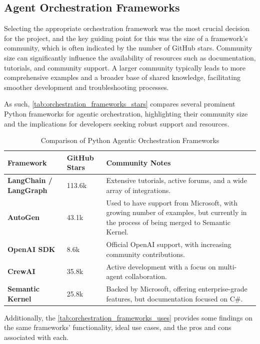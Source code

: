 \documentclass[a4paper]{report}
\begin{document}
\subsection{Agent Orchestration Frameworks}

Selecting the appropriate orchestration framework was the most crucial decision for the project, and the key guiding point for this was the size of a framework's community, which is often indicated by the number of GitHub stars. Community size can significantly influence the availability of resources such as documentation, tutorials, and community support. A larger community typically leads to more comprehensive examples and a broader base of shared knowledge, facilitating smoother development and troubleshooting processes.

As such, \autoref{tab:orchestration_frameworks_stars} compares several prominent Python frameworks for agentic orchestration, highlighting their community size and the implications for developers seeking robust support and resources.

\begin{table}[h]
\centering
\begin{tabular}{|p{3cm}|p{3cm}|p{9cm}|}
    \hline
    \textbf{Framework} & \textbf{GitHub Stars} & \textbf{Community Notes} \\ \hline
    \textbf{LangChain / LangGraph} & 113.6k & Extensive tutorials, active forums, and a wide array of integrations. \\ \hline
    \textbf{AutoGen} & 43.1k & Used to have support from Microsoft, with growing number of examples, but currently in the process of being merged to Semantic Kernel. \\ \hline
    \textbf{OpenAI SDK} & 8.6k & Official OpenAI support, with increasing community contributions. \\ \hline
    \textbf{CrewAI} & 35.8k & Active development with a focus on multi-agent collaboration. \\ \hline
    \textbf{Semantic Kernel} & 25.8k & Backed by Microsoft, offering enterprise-grade features, but documentation focused on C\#. \\ \hline
\end{tabular}
\caption{Comparison of Python Agentic Orchestration Frameworks}
\label{tab:orchestration_frameworks_stars}
\end{table}

Additionally, the \autoref{tab:orchestration_frameworks_uses} provides some findings on the same frameworks' functionality, ideal use cases, and the pros and cons associated with each.
\end{document}
